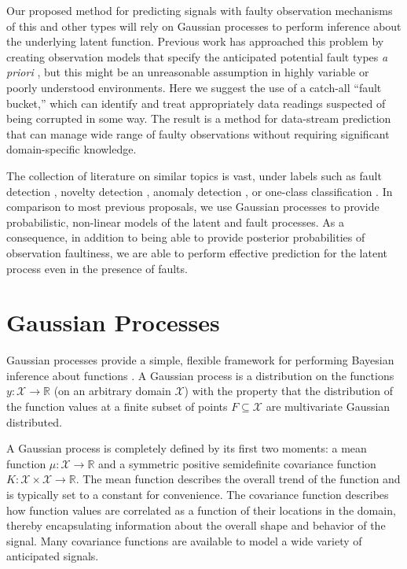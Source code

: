 \documentclass{article}
\newcommand{\R}{\ensuremath{\mathbb{R}}}
\newcommand{\cm}[1]{\ensuremath{\mathcal{#1}}}
\begin{document}
Our proposed method for predicting signals with faulty observation
mechanisms of this and other types will rely on Gaussian processes to
perform inference about the underlying latent function.  Previous work
has approached this problem by creating observation models that
specify the anticipated potential fault types \textit{a priori}
\cite{garnettosborne}, but this might be an unreasonable assumption
in highly variable or poorly understood environments.  Here we suggest
the use of a catch-all ``fault bucket,'' which can identify and treat appropriately
data readings suspected of being corrupted in some way.  The
result is a method for data-stream prediction that can manage wide range of faulty observations without
requiring significant domain-specific knowledge.

The collection of literature on similar topics is vast, under labels such as fault detection \cite{deFreitas1996, Isermann2005, Ding2008}, novelty detection \cite{Markou2003}, anomaly detection \cite{Chandola:2009}, or one-class classification \cite{Khan2010}. In comparison to most previous proposals, we use Gaussian processes to provide probabilistic, non-linear models of the latent and fault processes. As a consequence, in addition to being able to provide posterior probabilities of observation faultiness, we are  able to perform effective prediction for the latent process even in the presence of faults.

\section{Gaussian Processes}
Gaussian processes provide a simple, flexible framework for
performing Bayesian inference about functions \cite{gpml}.  A
Gaussian process is a distribution on the functions
$y\colon \cm{X} \to \R$ (on an arbitrary domain $\cm{X}$) with the
property that the distribution of the function values at a finite
subset of points $F \subseteq \cm{X}$ are multivariate Gaussian
distributed.

A Gaussian process is completely defined by its first two moments: a
mean function $\mu\colon \cm{X} \to \R$ and a symmetric positive
semidefinite covariance function $K\colon \cm{X} \times \cm{X} \to
\R$.  The mean function describes the overall trend of the function
and is typically set to a constant for convenience.  The covariance
function describes how function values are correlated as a function of
their locations in the domain, thereby encapsulating information about
the overall shape and behavior of the signal.  Many covariance functions are available to model a wide variety of anticipated signals.
\end{document}
